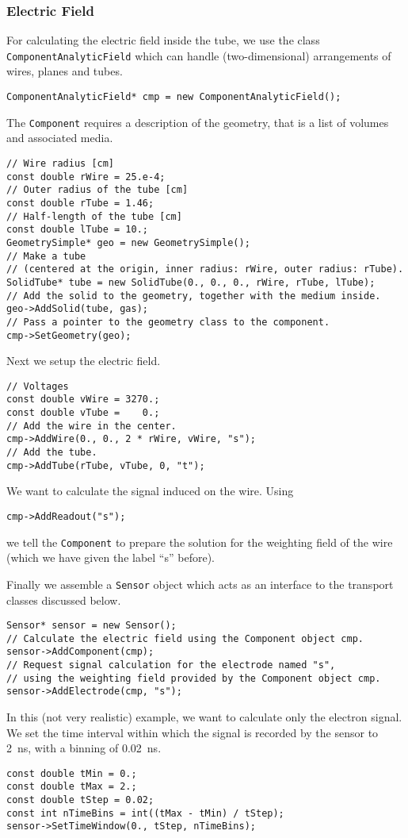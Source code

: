 \subsubsection{Electric Field}
For calculating the electric field inside the tube, 
we use the class \texttt{ComponentAnalyticField} which can handle 
(two-dimensional) arrangements of wires, planes and tubes.
\begin{lstlisting}
ComponentAnalyticField* cmp = new ComponentAnalyticField();
\end{lstlisting} 
The \texttt{Component} requires a description of the 
geometry, that is a list of volumes and associated media.
\begin{lstlisting}
// Wire radius [cm]
const double rWire = 25.e-4;
// Outer radius of the tube [cm]
const double rTube = 1.46;
// Half-length of the tube [cm]
const double lTube = 10.;
GeometrySimple* geo = new GeometrySimple();
// Make a tube 
// (centered at the origin, inner radius: rWire, outer radius: rTube).
SolidTube* tube = new SolidTube(0., 0., 0., rWire, rTube, lTube);
// Add the solid to the geometry, together with the medium inside.
geo->AddSolid(tube, gas);
// Pass a pointer to the geometry class to the component.
cmp->SetGeometry(geo); 
\end{lstlisting}
Next we setup the electric field.
\begin{lstlisting}
// Voltages
const double vWire = 3270.;
const double vTube =    0.;
// Add the wire in the center.
cmp->AddWire(0., 0., 2 * rWire, vWire, "s");
// Add the tube.
cmp->AddTube(rTube, vTube, 0, "t");
\end{lstlisting}
We want to calculate the signal induced on the wire. 
Using 
\begin{lstlisting}
cmp->AddReadout("s");
\end{lstlisting}
we tell the \texttt{Component} to prepare the solution for the weighting field 
of the wire (which we have given the label ``s'' before).
 
Finally we assemble a \texttt{Sensor} object which acts as an 
interface to the transport classes discussed below.
\begin{lstlisting}
Sensor* sensor = new Sensor();
// Calculate the electric field using the Component object cmp.
sensor->AddComponent(cmp);
// Request signal calculation for the electrode named "s", 
// using the weighting field provided by the Component object cmp.
sensor->AddElectrode(cmp, "s"); 
\end{lstlisting}

In this (not very realistic) example, we want to calculate only the 
electron signal. We set the time interval within which the 
signal is recorded by the sensor to 2~ns, with a binning of 0.02~ns. 
\begin{lstlisting}
const double tMin = 0.;
const double tMax = 2.;
const double tStep = 0.02;
const int nTimeBins = int((tMax - tMin) / tStep);
sensor->SetTimeWindow(0., tStep, nTimeBins);
\end{lstlisting}

